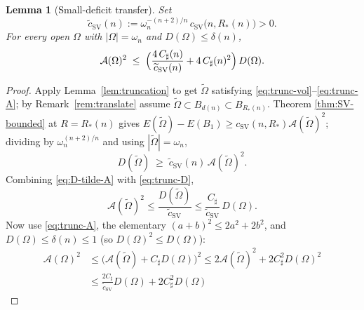 \documentclass[11pt]{amsart}
\newtheorem{lemma}[theorem]{Lemma}
\theoremstyle{definition}
\newcommand{\Om}{\Omega}
\newcommand{\Fr}{\mathcal A}
\newcommand{\abs}[1]{\left|#1\right|}
\newcommand{\Otilde}{\widetilde{\Omega}}
\begin{document}
\begin{lemma}[Small-deficit transfer]\label{lem:near}
Set
\begin{equation}\label{eq:csv-tilde}
   \widetilde c_{\mathrm{SV}}(n)
   :=\omega_n^{-(n+2)/n}\,c_{\mathrm{SV}}\bigl(n,R_*(n)\bigr)>0 .
\end{equation}
For every open $\Om$ with $\abs{\Om}=\omega_n$ and
$D(\Om)\le\delta(n)$,
\begin{equation}\label{eq:near-Fr}
   \Fr(\Om)^2\;\le\;
   \Bigl(\frac{4\,C_\sharp(n)}{\widetilde c_{\mathrm{SV}}(n)}
        +4\,C_\sharp(n)^2\Bigr)\,D(\Om).
\end{equation}
\end{lemma}

\begin{proof}
Apply Lemma~\ref{lem:truncation} to get $\Otilde$ satisfying
\eqref{eq:trunc-vol}--\eqref{eq:trunc-A}; by Remark~\ref{rem:translate}
assume $\Otilde\subset B_{d(n)}\subset B_{R_*(n)}$. Theorem
\ref{thm:SV-bounded} at $R=R_*(n)$ gives
$E(\Otilde)-E(B_1)\ge c_{\mathrm{SV}}(n,R_*)\Fr(\Otilde)^2$; dividing by
$\omega_n^{(n+2)/n}$ and using $\abs{\Otilde}=\omega_n$,
\begin{equation}\label{eq:D-tilde-A}
   D(\Otilde)\;\ge\;\widetilde c_{\mathrm{SV}}(n)\,\Fr(\Otilde)^2 .
\end{equation}
Combining \eqref{eq:D-tilde-A} with \eqref{eq:trunc-D},
\[
   \Fr(\Otilde)^2\le\frac{D(\Otilde)}{\widetilde c_{\mathrm{SV}}}
   \le\frac{C_\sharp}{\widetilde c_{\mathrm{SV}}}\,D(\Om).
\]
Now use \eqref{eq:trunc-A}, the elementary
$(a+b)^2\le2a^2+2b^2$, and $D(\Om)\le\delta(n)\le1$ (so
$D(\Om)^2\le D(\Om)$):
\begin{align*}
   \Fr(\Om)^2
   &\le\bigl(\Fr(\Otilde)+C_\sharp D(\Om)\bigr)^2
    \le2\Fr(\Otilde)^2+2C_\sharp^2D(\Om)^2\\
   &\le\frac{2C_\sharp}{\widetilde c_{\mathrm{SV}}}D(\Om)+2C_\sharp^2D(\Om)

\end{align*}
\end{proof}
\end{document}
